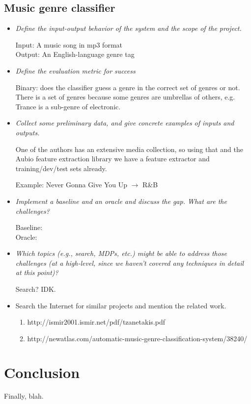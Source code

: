 \documentclass[12pt]{article}
\begin{document}
\subsection{Music genre classifier}
\begin{itemize}
  \item  \emph{Define the input-output behavior of the system and the scope of the project.}

    Input: A music song in mp3 format\\
    Output: An English-language genre tag

  \item  \emph{Define the evaluation metric for success}
    
    Binary: does the classifier guess a genre in the correct set of
    genres or not. There is a set of genres because some genres are
    umbrellas of others, e.g. Trance is a sub-genre of electronic.

  \item  \emph{Collect some preliminary data, and give concrete examples of inputs and outputs.}

    One of the authors has an extensive media collection, so using
    that and the Aubio feature extraction library we have a feature
    extractor and training/dev/test sets already.

    Example: Never Gonna Give You Up $\rightarrow$ R\&B
    
  \item \emph{Implement a baseline and an oracle and discuss the gap. What are the challenges?}

    Baseline: \\
    Oracle: 
    
  \item \emph{Which topics (e.g., search, MDPs, etc.) might be able to address those challenges (at a high-level, since we haven't covered any techniques in detail at this point)?}

    Search? IDK.
    
  \item  Search the Internet for similar projects and mention the related work.
    \begin{enumerate}
      \item http://ismir2001.ismir.net/pdf/tzanetakis.pdf
      \item http://newatlas.com/automatic-music-genre-classification-system/38240/
    \end{enumerate}
    
\end{itemize}
\section*{Conclusion}

Finally, blah.
\end{document}
